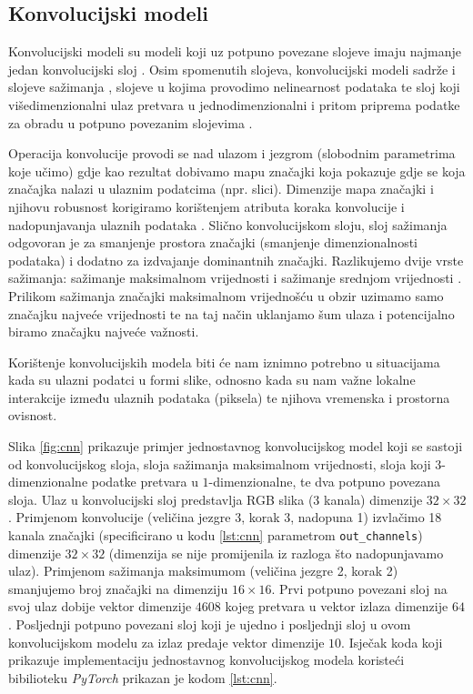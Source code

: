\subsection{Konvolucijski modeli}

Konvolucijski modeli  su modeli koji uz potpuno povezane slojeve imaju najmanje jedan konvolucijski sloj . Osim spomenutih slojeva, konvolucijski modeli sadrže i slojeve sažimanja , slojeve u kojima provodimo nelinearnost podataka te sloj koji višedimenzionalni ulaz pretvara u jednodimenzionalni i pritom priprema podatke za obradu u potpuno povezanim slojevima .

Operacija konvolucije provodi se nad ulazom i jezgrom  (slobodnim parametrima koje učimo) gdje kao rezultat dobivamo mapu značajki koja pokazuje gdje se koja značajka nalazi u ulaznim podatcima (npr. slici). Dimenzije mapa značajki i njihovu robusnost korigiramo korištenjem atributa koraka konvolucije  i nadopunjavanja ulaznih podataka . Slično konvolucijskom sloju, sloj sažimanja odgovoran je za smanjenje prostora značajki (smanjenje dimenzionalnosti podataka) i dodatno za izdvajanje dominantnih značajki. Razlikujemo dvije vrste sažimanja: sažimanje maksimalnom vrijednosti  i sažimanje srednjom vrijednosti . Prilikom sažimanja značajki maksimalnom vrijednošću u obzir uzimamo samo značajku najveće vrijednosti te na taj način uklanjamo šum ulaza i potencijalno biramo značajku najveće važnosti.

Korištenje konvolucijskih modela biti će nam iznimno potrebno u situacijama kada su ulazni podatci u formi slike, odnosno kada su nam važne lokalne interakcije između ulaznih podataka (piksela) te njihova vremenska i prostorna ovisnost.

Slika \ref{fig:cnn} \cite{NNsvg} prikazuje primjer jednostavnog konvolucijskog model koji se sastoji od konvolucijskog sloja, sloja sažimanja maksimalnom vrijednosti, sloja koji $3$-dimenzionalne podatke pretvara u $1$-dimenzionalne, te dva potpuno povezana sloja. Ulaz u konvolucijski sloj predstavlja RGB slika (3 kanala) dimenzije $32 \times 32$. Primjenom konvolucije (veličina jezgre 3, korak 3, nadopuna 1) izvlačimo 18 kanala značajki (specificirano u kodu \ref{lst:cnn} parametrom \texttt{out_channels}) dimenzije $32 \times 32$ (dimenzija se nije promijenila iz razloga što nadopunjavamo ulaz). Primjenom sažimanja maksimumom (veličina jezgre 2, korak 2) smanjujemo broj značajki na dimenziju $16 \times 16$. Prvi potpuno povezani sloj na svoj ulaz dobije vektor dimenzije $4608$ kojeg pretvara u vektor izlaza dimenzije $64$. Posljednji potpuno povezani sloj koji je ujedno i posljednji sloj u ovom konvolucijskom modelu za izlaz predaje vektor dimenzije $10$. Isječak koda koji prikazuje implementaciju jednostavnog konvolucijskog modela koristeći bibilioteku \textit{PyTorch} prikazan je kodom \ref{lst:cnn}.

